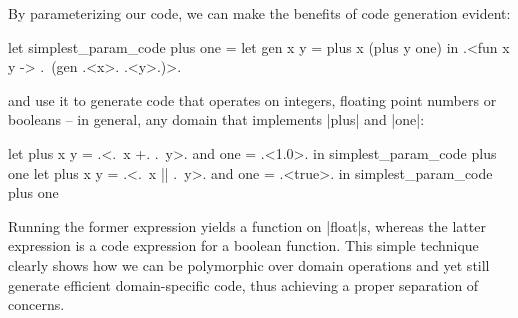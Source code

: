 \documentclass{elsart}
\begin{document}
By parameterizing our code, we can make the benefits of code generation
evident:

\begin{code}
let simplest_param_code plus one =
  let gen x y = plus x (plus y one) in
  .<fun x y -> .~(gen .<x>. .<y>.)>.
\end{code}
and use it to generate code that operates on integers, floating point
numbers or booleans -- in general, any domain that implements |plus|
and |one|:
\begin{code}
let plus x y = .<.~x +. .~y>. and one = .<1.0>. in
  simplest_param_code plus one
let plus x y = .<.~x || .~y>. and one = .<true>. in
  simplest_param_code plus one
\end{code}
Running the former expression yields a function on |float|s, whereas
the latter expression is a code expression for a boolean function.
This simple technique clearly shows how we can be polymorphic over
domain operations and yet still generate efficient domain-specific code,
thus achieving a proper separation of concerns.
\end{document}
